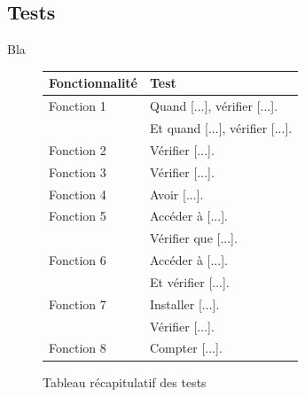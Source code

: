 \subsection{Tests}

Bla\\

\begin{figure}[!h]
\begin{center}
\begin{tabularx}{17cm}{|p{6cm}|X|}
  \hline
  Fonctionnalité & Test\\
  \hline
  Fonction 1 & Quand [...], vérifier [...]. \tabularnewline
  & Et quand [...], vérifier [...]. \tabularnewline
  Fonction 2 & Vérifier [...]. \tabularnewline
  Fonction 3 & Vérifier [...]. \tabularnewline
  Fonction 4 & Avoir [...]. \tabularnewline
  Fonction 5 & Accéder à [...]. \tabularnewline
   & Vérifier que [...]. \tabularnewline
  Fonction 6 & Accéder à [...]. \tabularnewline
   & Et vérifier [...]. \tabularnewline
  Fonction 7 & Installer [...]. \tabularnewline
   & Vérifier [...]. \tabularnewline
  Fonction 8 & Compter [...]. \tabularnewline
  \hline
\end{tabularx}
\end{center}
\caption{Tableau récapitulatif des tests}
\end{figure}
\fi
